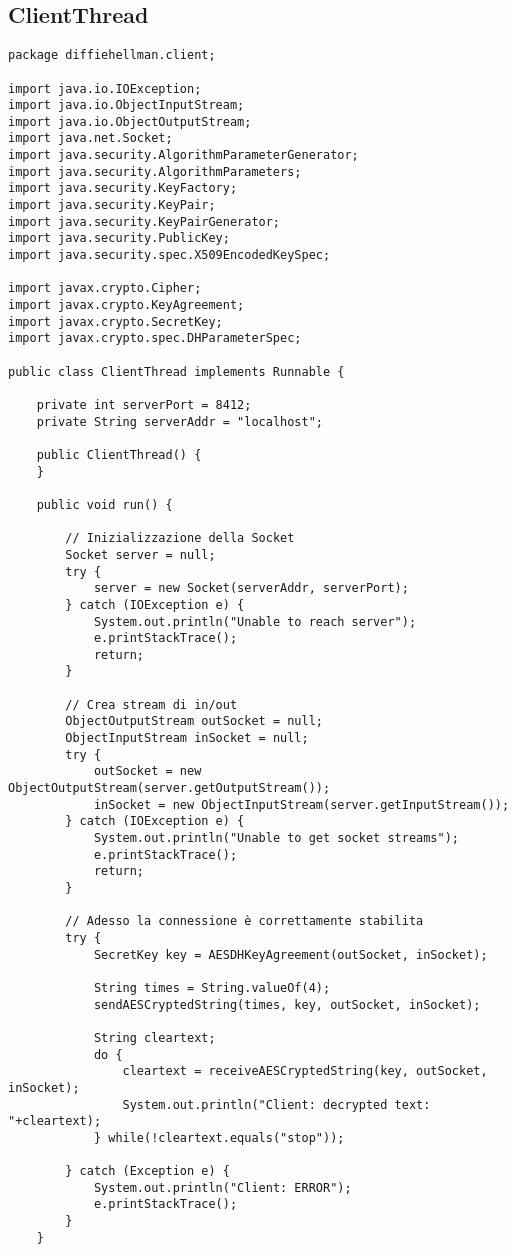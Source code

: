 \documentclass[12pt]{article}
\begin{document}
\subsection*{ClientThread}
\begin{lstlisting}
package diffiehellman.client;

import java.io.IOException;
import java.io.ObjectInputStream;
import java.io.ObjectOutputStream;
import java.net.Socket;
import java.security.AlgorithmParameterGenerator;
import java.security.AlgorithmParameters;
import java.security.KeyFactory;
import java.security.KeyPair;
import java.security.KeyPairGenerator;
import java.security.PublicKey;
import java.security.spec.X509EncodedKeySpec;

import javax.crypto.Cipher;
import javax.crypto.KeyAgreement;
import javax.crypto.SecretKey;
import javax.crypto.spec.DHParameterSpec;

public class ClientThread implements Runnable {

	private int serverPort = 8412;
	private String serverAddr = "localhost";

	public ClientThread() {
	}

	public void run() {

		// Inizializzazione della Socket
		Socket server = null;
		try {
			server = new Socket(serverAddr, serverPort);
		} catch (IOException e) {
			System.out.println("Unable to reach server");
			e.printStackTrace();
			return;
		}

		// Crea stream di in/out
		ObjectOutputStream outSocket = null;
		ObjectInputStream inSocket = null;
		try {
			outSocket = new ObjectOutputStream(server.getOutputStream());
			inSocket = new ObjectInputStream(server.getInputStream());
		} catch (IOException e) {
			System.out.println("Unable to get socket streams");
			e.printStackTrace();
			return;
		}

		// Adesso la connessione è correttamente stabilita
		try {
			SecretKey key = AESDHKeyAgreement(outSocket, inSocket);

			String times = String.valueOf(4);
			sendAESCryptedString(times, key, outSocket, inSocket);

			String cleartext;
			do {
				cleartext = receiveAESCryptedString(key, outSocket, inSocket);
				System.out.println("Client: decrypted text: "+cleartext);
			} while(!cleartext.equals("stop"));

		} catch (Exception e) {
			System.out.println("Client: ERROR");
			e.printStackTrace();
		}
	}


\end{lstlisting}
\end{document}
